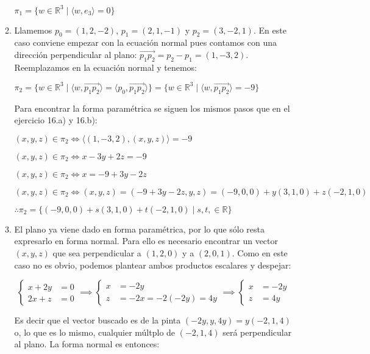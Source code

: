 \documentclass[a4paper,12pt,twoside,spanish,reqno]{amsbook}
\numberwithin{equation}{section}
\begin{document}
\begin{enumerate}[resume]
\begin{enumerate}
$\pi_1 = \boxed{ \{ w \in \mathbb{R}^3 \; | \; \langle w,e_3 \rangle = 0  \} }$

	\item Llamemos $p_0 = (1,2,-2)$, $p_1 = (2,1,-1)$ y $p_2=(3,-2,1)$. En este caso conviene empezar con la ecuación normal pues contamos con una dirección perpendicular al plano: $\overrightarrow{p_1 p_2} = p_2 - p_1 = (1,-3,2)$. Reemplazamos en la ecuación normal y tenemos:
	
$\pi_2 = \{ w \in \mathbb{R}^3 \; | \; \langle w, \overrightarrow{p_1 p_2} \rangle =  \langle p_0, \overrightarrow{p_1 p_2} \rangle \} = \boxed{ \{ w \in \mathbb{R}^3 \; | \; \langle w, \overrightarrow{p_1 p_2} \rangle =  -9 \} }$

Para encontrar la forma paramétrica se siguen los mismos pasos que en el ejercicio 16.a) y 16.b):

$ (x,y,z) \in \pi_2 \iff \langle (1,-3,2) , (x,y,z) \rangle = -9$

$ (x,y,z) \in \pi_2 \iff x -3y +2z = -9$

$ (x,y,z) \in \pi_2 \iff x = -9 + 3y -2z$

$ (x,y,z) \in \pi_2 \iff (x,y,z) = (-9 + 3y -2z ,y,z) = (-9,0,0) + y (3,1,0) + z (-2,1,0)$

$ \therefore \boxed{ \pi_2 = \{ (-9,0,0) + s (3,1,0) + t (-2,1,0) \; | \; s,t, \in \mathbb{R} \} }$


	\item El plano ya viene dado en forma paramétrica, por lo que sólo resta expresarlo en forma normal. Para ello es necesario encontrar un vector $(x,y,z)$ que sea perpendicular a $(1,2,0)$ y a $(2,0,1)$. Como en este caso no es obvio, podemos plantear ambos productos escalares y despejar:
	
\begin{equation*}
\left\{ \begin{array}{rl}
x + 2 y &= 0 \\
2x+z &= 0
\end{array} \right. \implies
\left\{ \begin{array}{rl}
x &= -2y \\
z &= -2x = -2 (-2y) = 4y
\end{array} \right. \implies
\left\{ \begin{array}{rl}
x &= -2y \\
z &= 4y
\end{array} \right.
\end{equation*}

Es decir que el vector buscado es de la pinta $(-2y,y,4y) = y(-2,1,4)$ o, lo que es lo mismo, cualquier múltplo de $(-2,1,4)$ será perpendicular al plano. La forma normal es entonces:


\end{enumerate}
\end{enumerate}
\end{document}
